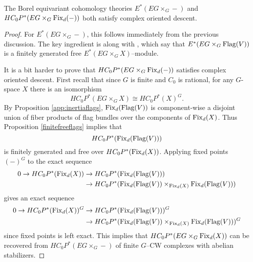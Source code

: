 \begin{proposition}
The Borel equivariant cohomology theories \(E^*(EG \times_G -)\) and \(HC_{0}P^{*}(EG \times_G \operatorname{Fix}_d(-))\) both satisfy complex oriented descent.
\end{proposition}
\begin{proof}
For \(E^*(EG \times_G -)\), this follows immediately from the previous discussion.  The key ingredient is  along with , which say that \(E^*(EG \times_G \operatorname{Flag}(V))\) is a finitely generated free \(E^*(EG \times_G X)\)--module. 

It is a bit harder to prove that \(HC_{0}P^{*}(EG \times_G \operatorname{Fix}_d(-))\) satisfies complex oriented descent. First recall that since \(G\) is finite and \(C_0\) is rational, for any \(G\)-space \(X\) there is an isomorphism
\[
HC_0P^*(EG \times_G X) \cong HC_0P^*(X)^G.
\]
By Proposition \ref{app:inertiaflags}, \(\operatorname{Fix}_d(\operatorname{Flag}(V))\) is component-wise a disjoint union of fiber products of flag bundles over the components of \(\operatorname{Fix}_d(X)\). Thus Proposition \ref{finitefreeflags} implies that
\[
HC_0P^*(\operatorname{Fix}_d(\operatorname{Flag}(V)))
\]
is finitely generated and free over \(HC_0P^*(\operatorname{Fix}_d(X))\). Applying fixed points \((-)^G\) to the exact sequence
\begin{align*}
0 \to HC_0P^*(\operatorname{Fix}_d(X)) & \to HC_0P^*(\operatorname{Fix}_d(\operatorname{Flag}(V))) \\
& \to HC_0P^*(\operatorname{Fix}_d(\operatorname{Flag}(V)) \times_{\operatorname{Fix}_d(X)} \operatorname{Fix}_d(\operatorname{Flag}(V)))
\end{align*}
gives an exact sequence
\begin{align*}
0 \to HC_0P^*(\operatorname{Fix}_d(X))^G & \to HC_0P^*(\operatorname{Fix}_d(\operatorname{Flag}(V)))^G \\
& \to HC_0P^*(\operatorname{Fix}_d(\operatorname{Flag}(V)) \times_{\operatorname{Fix}_d(X)} \operatorname{Fix}_d(\operatorname{Flag}(V)))^G
\end{align*}
since fixed points is left exact. This implies that \(HC_0P^*(EG \times_G \operatorname{Fix}_d(X))\) can be recovered from \(HC_0P^*(EG \times_G-)\) of finite \(G\)--CW complexes with abelian stabilizers.
\end{proof}


